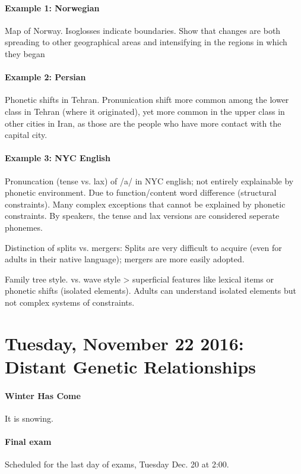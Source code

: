 \documentclass{exam}
\begin{document}
\paragraph{Example 1: Norwegian} Map of Norway. Isoglosses indicate boundaries. Show that changes are both spreading to other geographical areas and intensifying in the regions in which they began

\paragraph{Example 2: Persian} Phonetic shifts in Tehran. Pronunication shift more common among the lower class in Tehran (where it originated), yet more common in the upper class in other cities in Iran, as those are the people who have more contact with the capital city. 

\paragraph{Example 3: NYC English} Pronuncation (tense vs. lax) of /a/ in NYC english; not entirely explainable by phonetic environment. Due to function/content word difference (structural constraints). 
Many complex exceptions that cannot be explained by phonetic constraints. 
By speakers, the tense and lax versions are considered seperate phonemes. 

Distinction of splits vs. mergers: Splits are very difficult to acquire (even for adults in their native language); mergers are more easily adopted. 

Family tree style. vs. wave style > superficial features like lexical items or phonetic shifts (isolated elements). 
Adults can understand isolated elements but not complex systems of constraints. 


\section*{Tuesday, November 22 2016: Distant Genetic Relationships}

\paragraph{Winter Has Come} It is snowing. 

\paragraph{Final exam} Scheduled for the last day of exams, Tuesday Dec. 20 at 2:00. 
\end{document}
